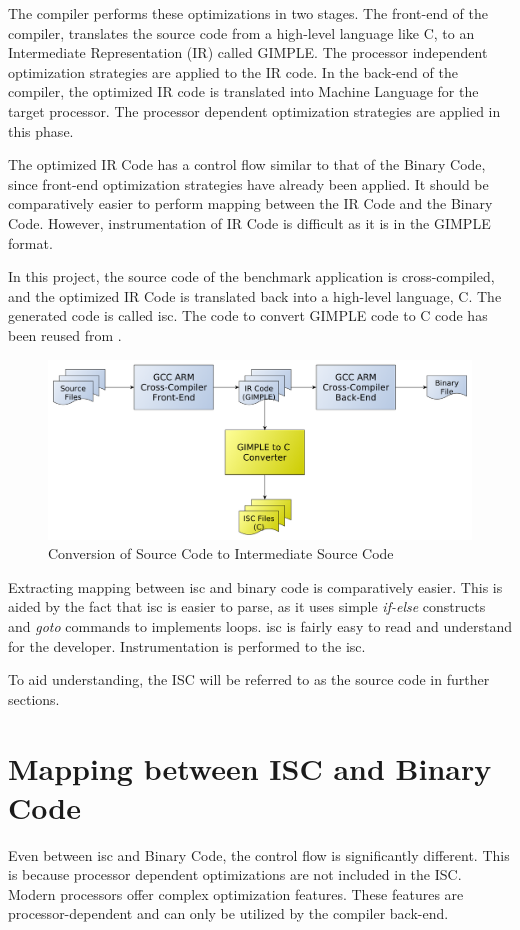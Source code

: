 The compiler performs these optimizations in two stages. The front-end of the compiler, translates the source code from a high-level language like C, to an Intermediate Representation (IR) called GIMPLE. The processor independent optimization strategies are applied to the IR code. In the back-end of the compiler, the optimized IR code is translated into Machine Language for the target processor. The processor dependent optimization strategies are applied in this phase.

The optimized IR Code has a control flow similar to that of the Binary Code, since front-end optimization strategies have already been applied. It should be comparatively easier to perform mapping between the IR Code and the Binary Code. However, instrumentation of IR Code is difficult as it is in the GIMPLE format. 

In this project, the source code of the benchmark application is cross-compiled, and the optimized IR Code is translated back into a high-level language, C. The generated code is called \gls{isc}. The code to convert GIMPLE code to C code has been reused from \cite{RBA2013}.

\begin{figure}[h]
\centering
\includegraphics[width=.9\textwidth]{figures/ir2cConversion.pdf}
\caption{Conversion of Source Code to Intermediate Source Code}
\label{fig:ir2cConversion}
\end{figure}

Extracting mapping between \gls{isc} and binary code is comparatively easier. This is aided by the fact that \gls{isc} is easier to parse, as it uses simple \emph{if-else} constructs and \emph{goto} commands to implements loops. \gls{isc} is fairly easy to read and understand for the developer. Instrumentation is performed to the \gls{isc}. 

To aid understanding, the ISC will be referred to as the source code in further sections.

\section{Mapping between ISC and Binary Code}
Even between \gls{isc} and Binary Code, the control flow is significantly different. This is because processor dependent optimizations are not included in the ISC. Modern processors offer complex optimization features. These features are processor-dependent and can only be utilized by the compiler back-end.

